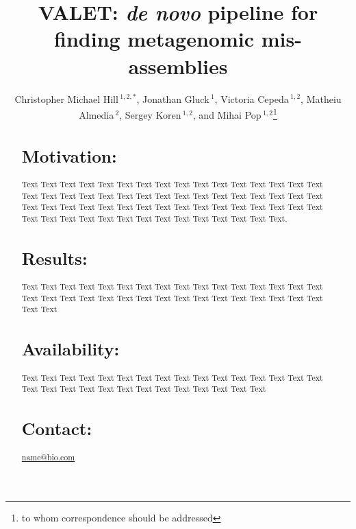 \documentclass{bioinfo}
\begin{document}

\title[VALET]{VALET: \emph{de novo} pipeline for finding metagenomic mis-assemblies}
\author[Hill \textit{et~al}]{Christopher Michael Hill\,$^{1,2,*}$, Jonathan Gluck\,$^{1}$, Victoria Cepeda\,$^{1,2}$, Matheiu Almedia\,$^{2}$, Sergey Koren\,$^{1,2}$, and Mihai Pop\,$^{1,2}$\footnote{to whom correspondence should be addressed}}
\address{$^{1}$Department of Computer Science,
University of Maryland, College Park, Maryland, 20742
USA\\ $^{2}$ Center
for Bioinformatics and Computational Biology, University of
Maryland, College Park, Maryland, 20742 USA.}



\maketitle

\begin{abstract}

\section{Motivation:}
Text Text Text  Text Text Text Text Text Text Text Text
Text  Text Text Text Text Text Text Text Text Text  Text Text Text Text Text Text Text Text Text  Text Text Text Text Text Text Text Text Text  Text Text Text Text Text Text Text Text Text  Text Text Text Text Text Text Text Text Text  Text Text Text Text Text.

\section{Results:}
Text  Text Text Text Text Text Text Text Text Text  Text Text Text Text Text Text Text Text Text  Text Text Text Text Text Text Text Text Text  Text Text Text Text Text Text

\section{Availability:}
Text  Text Text Text Text Text Text Text Text Text  Text Text Text Text Text Text Text Text Text  Text Text Text Text Text Text Text Text Text  Text

\section{Contact:} \href{name@bio.com}{name@bio.com}
\end{abstract}
\end{document}
